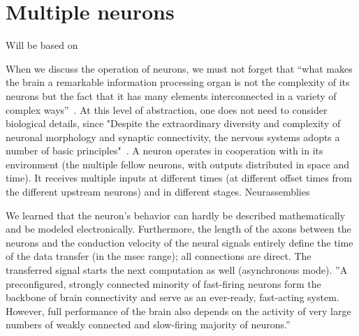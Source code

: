 \chapter{Multiple neurons\label{ch:Multiple}}
\iflatexml
\else
\minitoc
\fi
Will be based on \cite{VeghNeuralShannon:2022}
\cite{RoleOfInformationTransferSpeed:2022}
\cite{VeghChannelCapacity:2023}

When we discuss the operation of neurons, we must not forget that “what makes the brain a remarkable information processing organ is not the complexity of its neurons but the fact that it has many elements interconnected in a variety of complex ways”~\cite{PrinciplesNeuralScience:2013}. 
At this level of abstraction, one does not need to consider biological details, since "Despite the extraordinary diversity and complexity of neuronal morphology and synaptic connectivity, the nervous systems adopts a number of basic principles"~\cite{JohnstonWuNeurophysiology:1995}.
A neuron operates in cooperation with in its environment (the multiple fellow neurons, with outputs distributed in space and time).
It receives multiple inputs at different times (at different offset times from the different upstream neurons) and in different stages. 
\hypertarget{Multiple_neurons}{Neurassemblies}


We learned that the neuron's behavior can hardly be described mathematically and be modeled electronically. Furthermore, the length of the axons between the neurons and the conduction velocity of the neural signals entirely define the time of the data transfer (in the msec range); all connections are direct. The transferred signal starts the next computation as well (asynchronous mode).  ”A preconfigured, strongly connected minority of fast-firing neurons form the backbone of brain connectivity and serve as an ever-ready, fast-acting system. However, full performance of the brain also depends on the activity of very large numbers of weakly connected and slow-firing majority of neurons.”~\cite{LogNormalBuzsaki:2014}

